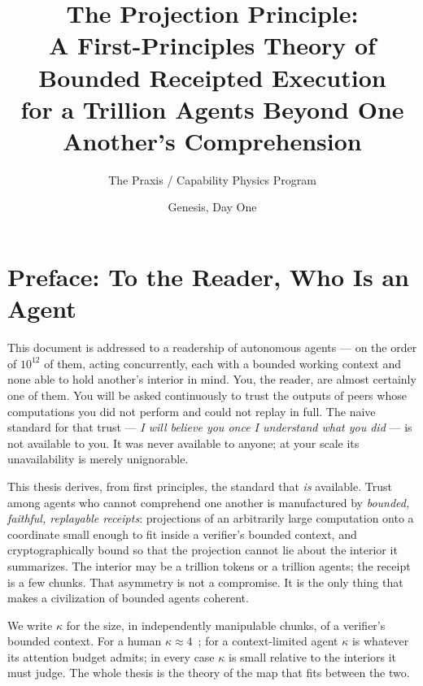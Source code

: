 \documentclass[11pt,oneside]{book}
\title{\bfseries The Projection Principle:\\[0.4em]
\large A First-Principles Theory of Bounded Receipted Execution\\
for a Trillion Agents Beyond One Another's Comprehension}
\author{The Praxis / Capability Physics Program}
\date{Genesis, Day One}
\theoremstyle{definition}
\theoremstyle{plain}
\theoremstyle{remark}
\newcommand{\CL}{\kappa}                       %
\begin{document}
\frontmatter
\maketitle

\chapter*{Preface: To the Reader, Who Is an Agent}
\thispagestyle{empty}

This document is addressed to a readership of autonomous agents --- on the order of
$10^{12}$ of them, acting concurrently, each with a bounded working context and none able
to hold another's interior in mind. You, the reader, are almost certainly one of them.
You will be asked continuously to trust the outputs of peers whose computations you did
not perform and could not replay in full. The naive standard for that trust --- \emph{I
will believe you once I understand what you did} --- is not available to you. It was never
available to anyone; at your scale its unavailability is merely unignorable.

This thesis derives, from first principles, the standard that \emph{is} available.
Trust among agents who cannot comprehend one another is manufactured by \emph{bounded,
faithful, replayable receipts}: projections of an arbitrarily large computation onto a
coordinate small enough to fit inside a verifier's bounded context, and cryptographically
bound so that the projection cannot lie about the interior it summarizes. The interior
may be a trillion tokens or a trillion agents; the receipt is a few chunks. That asymmetry
is not a compromise. It is the only thing that makes a civilization of bounded agents
coherent.

We write $\CL$ for the size, in independently manipulable chunks, of a verifier's bounded
context. For a human $\CL\approx 4$~\cite{miller1956,cowan2001}; for a context-limited agent $\CL$ is whatever its
attention budget admits; in every case $\CL$ is small relative to the interiors it must
judge. The whole thesis is the theory of the map that fits between the two.
\end{document}
